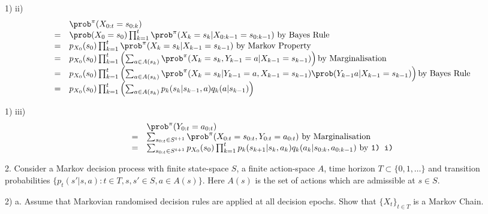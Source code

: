 \documentclass[11pt,a4paper]{article}
\begin{document}
\begin{answer}{1) ii)}
  \[\begin{array}{rl}
    &\prob^\pi(X_{0:t}=s_{0:k})\\
    =&\prob(X_0=s_0)\prod_{k=1}^t\prob^\pi(X_k=s_k|X_{0:k-1}=s_{0:k-1})\text{ by Bayes Rule}\\
    =&p_{X_0}(s_0)\prod_{k=1}^t\prob^\pi(X_k=s_k|X_{k-1}=s_{k-1})\text{ by Markov Property}\\
    =&p_{X_0}(s_0)\prod_{k=1}^t\left(\sum_{a\in A(s_k)}\prob^\pi(X_k=s_k,Y_{k-1}=a|X_{k-1}=s_{k-1})\right)\text{by Marginalisation}\\
    =&p_{X_0}(s_0)\prod_{k=1}^t\left(\sum_{a\in A(s_k)}\prob^\pi(X_k=s_k|Y_{k-1}=a,X_{k-1}=s_{k-1})\prob(Y_{k-1}a|X_{k-1}=s_{k-1})\right)\text{by Bayes Rule}\\
    =&p_{X_0}(s_0)\prod_{k=1}^t\left(\sum_{a\in A(s_k)}p_k(s_k|s_{k-1},a)q_k(a|s_{k-1})\right)
  \end{array}\]
\end{answer}

\begin{answer}{1) iii)}
  \[\begin{array}{rl}
    &\prob^\pi(Y_{0:t}=a_{0:t})\\
    =&\sum_{s_{0:t}\in S^{t+1}}\prob^\pi(X_{0:t}=s_{0:t},Y_{0:t}=a_{0:t})\text{ by Marginalisation}\\
    =&\sum_{s_{0:t}\in S^{t+1}}p_{X_0}(s_0)\prod_{k=1}^tp_k(s_{k+1}|s_k,a_k)q_k(a_k|s_{0:k},a_{0:k-1})\text{ by \texttt{1) i)}}
  \end{array}\]
\end{answer}

\begin{question}{2.}
  Consider a Markov decision process with finite state-space $S$, a finite action-space $A$, time horizon $T\subset\{0,1,\dots\}$ and transition probabilities $\{p_t(s'|s,a):t\in T,s,s'\in S,a\in A(s)\}$. Here $A(s)$ is the set of actions which are admissible at $s\in S$.
\end{question}

\begin{question}{2) a.}
  Assume that Markovian randomised decision rules are applied at all decision epochs. Show that $\{X_t\}_{t\in T}$ is a Markov Chain.
\end{question}
\end{document}
